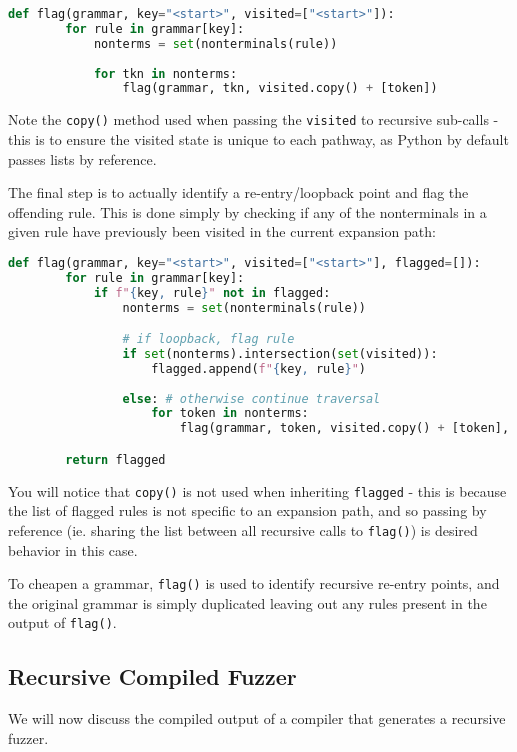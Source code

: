 \documentclass[8pt, twoside]{extarticle}
\begin{document}
\begin{lstlisting}[gobble=2, language=Python, caption={Visited state}] 
	def flag(grammar, key="<start>", visited=["<start>"]):
		for rule in grammar[key]:
			nonterms = set(nonterminals(rule))
				
			for tkn in nonterms:
				flag(grammar, tkn, visited.copy() + [token])

\end{lstlisting}

Note the \verb|copy()| method used when passing the \verb|visited| to recursive sub-calls - this is to ensure the visited state is unique to each pathway, as Python by default passes lists by reference.

The final step is to actually identify a re-entry/loopback point and flag the offending rule. This is done simply by checking if any of the nonterminals in a given rule have previously been visited in the current expansion path:

\begin{lstlisting}[gobble=2, language=Python, caption={Flagging re-entry points}] 
	def flag(grammar, key="<start>", visited=["<start>"], flagged=[]):
		for rule in grammar[key]:
			if f"{key, rule}" not in flagged:
				nonterms = set(nonterminals(rule))

				# if loopback, flag rule
				if set(nonterms).intersection(set(visited)):
					flagged.append(f"{key, rule}")
				
				else: # otherwise continue traversal 
					for token in nonterms:
						flag(grammar, token, visited.copy() + [token], flagged)

		return flagged
\end{lstlisting}

You will notice that \verb|copy()| is not used when inheriting \verb|flagged| - this is because the list of flagged rules is not specific to an expansion path, and so passing by reference (ie. sharing the list between all recursive calls to \verb|flag()|) is desired behavior in this case.

To cheapen a grammar, \verb|flag()| is used to identify recursive re-entry points, and the original grammar is simply duplicated leaving out any rules present in the output of \verb|flag()|.

\subsection{Recursive Compiled Fuzzer}

We will now discuss the compiled output of a compiler that generates a recursive fuzzer. 
\end{document}
